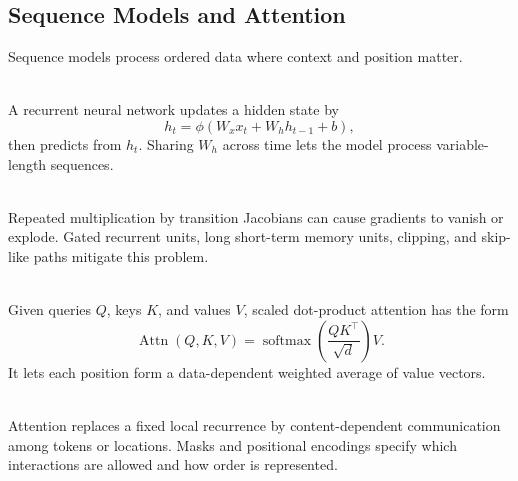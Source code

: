 \subsection{Sequence Models and Attention}

Sequence models process ordered data where context and position matter.

\begin{definition} \label{def:sl-recurrent-network} \\
A recurrent neural network updates a hidden state by
\[
h_t=\phi(W_xx_t+W_hh_{t-1}+b),
\]
then predicts from $h_t$.  Sharing $W_h$ across time lets the model process variable-length sequences.
\end{definition}

\begin{remark} \label{rem:sl-long-term-dependencies} \\
Repeated multiplication by transition Jacobians can cause gradients to vanish or explode.  Gated recurrent units, long short-term memory units, clipping, and skip-like paths mitigate this problem.
\end{remark}

\begin{definition} \label{def:sl-attention} \\
Given queries $Q$, keys $K$, and values $V$, scaled dot-product attention has the form
\[
\operatorname{Attn}(Q,K,V)
=
\operatorname{softmax}\!\left(\frac{QK^\top}{\sqrt{d}}\right)V.
\]
It lets each position form a data-dependent weighted average of value vectors.
\end{definition}

\begin{remark} \label{rem:sl-attention-as-routing} \\
Attention replaces a fixed local recurrence by content-dependent communication among tokens or locations.  Masks and positional encodings specify which interactions are allowed and how order is represented.
\end{remark}
